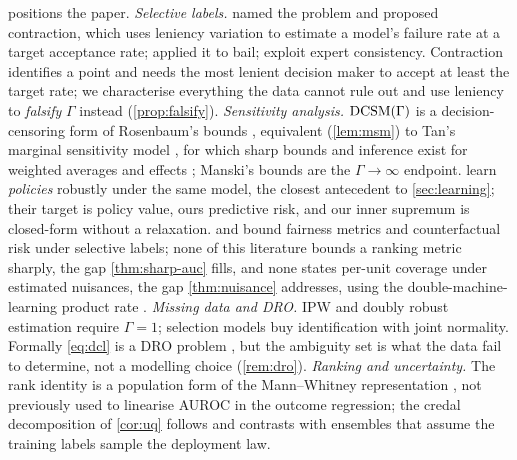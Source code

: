  positions the paper. \emph{Selective labels.}
\citet{lakkaraju2017selective} named the problem and proposed contraction,
which uses leniency variation to estimate a model's failure rate at a target
acceptance rate; \citet{kleinberg2018human} applied it to bail;
\citet{dearteaga2018learning} exploit expert consistency. Contraction
identifies a point and needs the most lenient decision maker to accept at
least the target rate; we characterise everything the data cannot rule out and
use leniency to \emph{falsify} $\Gamma$ instead (\cref{prop:falsify}).
\emph{Sensitivity analysis.} $\textup{DCSM}(\Gamma)$ is a decision-censoring form of
Rosenbaum's bounds \citep{rosenbaum2002observational}, equivalent
(\cref{lem:msm}) to Tan's marginal sensitivity model \citep{tan2006distributional},
for which sharp bounds and inference exist for weighted averages and effects
\citep{zhao2019sensitivity, yadlowsky2018bounds, dorn2023sharp}; Manski's
bounds \citep{manski1990nonparametric} are the $\Gamma\to\infty$ endpoint.
\citet{kallus2018confounding} learn \emph{policies} robustly under the same
model, the closest antecedent to \cref{sec:learning}; their target is policy
value, ours predictive risk, and our inner supremum is closed-form without a
relaxation. \citet{coston2021characterizing} and
\citet{rambachan2022counterfactual} bound fairness metrics and counterfactual
risk under selective labels; none of this literature bounds a ranking metric
sharply, the gap \cref{thm:sharp-auc} fills, and none states per-unit coverage
under estimated nuisances, the gap \cref{thm:nuisance} addresses, using the
double-machine-learning product rate \citep{chernozhukov2018double}.
\emph{Missing data and DRO.} IPW and doubly robust estimation
\citep{robins1994estimation} require $\Gamma=1$; selection models
\citep{heckman1979sample} buy identification with joint normality. Formally
\eqref{eq:dcl} is a DRO problem \citep{duchi2021learning}, but the ambiguity
set is what the data fail to determine, not a modelling choice
(\cref{rem:dro}). \emph{Ranking and
uncertainty.} The rank identity is a population form of the Mann--Whitney
representation \citep{mann1947test, hanley1982meaning}, not previously used
to linearise AUROC in the outcome regression; the credal decomposition of
\cref{cor:uq} follows \citet{abellan2005difference} and contrasts with
ensembles \citep{lakshminarayanan2017simple, hullermeier2021aleatoric} that
assume the training labels sample the deployment law.
